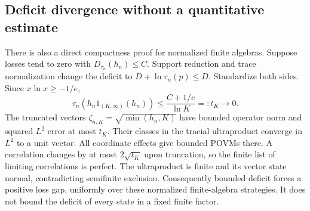 \subsection{Deficit divergence without a quantitative estimate}
There is also a direct compactness proof for normalized finite algebras. Suppose losses tend to zero with $D_{\tau_n}(h_n)\le C$. Support reduction and trace normalization change the deficit to $D+\ln\tau_n(p)\le D$. Standardize both sides. Since $x\ln x\ge-1/e$,
\[
 \tau_n(h_n1_{(K,\infty)}(h_n))\le\frac{C+1/e}{\ln K}=:t_K\longrightarrow0.
\]
The truncated vectors $\zeta_{n,K}=\sqrt{\min(h_n,K)}$ have bounded operator norm and squared $L^2$ error at most $t_K$. Their classes in the tracial ultraproduct converge in $L^2$ to a unit vector. All coordinate effects give bounded POVMs there. A correlation changes by at most $2\sqrt{t_K}$ upon truncation, so the finite list of limiting correlations is perfect. The ultraproduct is finite and its vector state normal, contradicting semifinite exclusion. Consequently bounded deficit forces a positive loss gap, uniformly over these normalized finite-algebra strategies. It does not bound the deficit of every state in a fixed finite factor.
